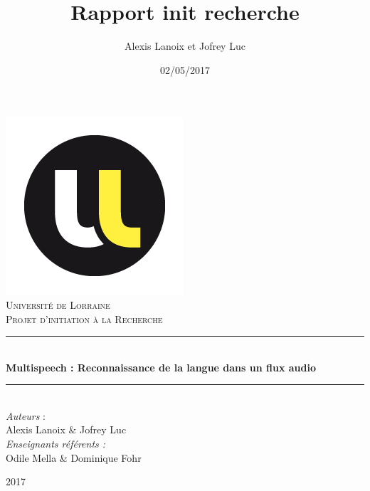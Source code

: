\documentclass{article}
\author{Alexis Lanoix et Jofrey Luc}
\title{Rapport init recherche}
\date{02/05/2017}
\newcommand\pythonstyle{\lstset{
  language=Python,
  backgroundcolor=\color{white}, 
  basicstyle=\ttm\small,
  emph={MyClass,__init__},          
  emphstyle=\ttb\color{deepred},    
  commentstyle=\color{red}, 
  frame=tb,                         
  showstringspaces=false,
  inputencoding=utf8,
  extendedchars=true,
  literate={é}{{\'e}}1 {î}{{\^i}}1 {ê}{{\^e}}1 {è}{{\`e}}1 {à}{{\`a}}1
}}
\newcommand{\HRule}{\rule{\linewidth}{0.5mm}}
\begin{document}
\begin{titlepage}
  \begin{sffamily}
  \begin{center}

    \includegraphics[scale=2]{img/univLorraine.png}~\\[1.5cm]

    \textsc{\LARGE Université de Lorraine}\\[2cm]

    \textsc{\Large Projet d'initiation à la Recherche}\\[1.5cm]

    \HRule \\[0.4cm]
    { \huge \bfseries Multispeech : Reconnaissance de la langue dans un flux audio\\[0.4cm] }

    \HRule \\[2cm]

    \textit{\large Auteurs} :\\[0.4cm]
    {\Large Alexis Lanoix \& Jofrey Luc}\\[1.2cm]
    
    \textit{\large Enseignants référents :}\\[0.4cm]
    {\Large Odile Mella \& Dominique Fohr}\\
    

    \vfill

    {\large 2017}

  \end{center}
  \end{sffamily}
\end{titlepage}



\thispagestyle{empty}

\tableofcontents
\newpage

\newcommand\pythonexternal[2][]{{
\pythonstyle
}}
\end{document}
